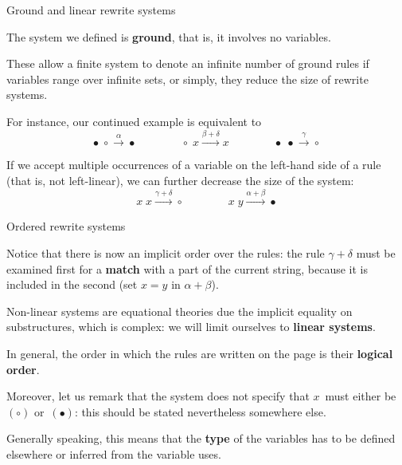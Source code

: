 \documentclass[compress,dvipdfmx]{beamer}
\begin{document}
%
\begin{frame}{Ground and linear rewrite systems}

  The system we defined is \textbf{ground}, that is, it involves no
  variables.

  \bigskip

  These allow a finite system to denote an infinite number of ground
  rules if variables range over infinite sets, or simply, they reduce
  the size of rewrite systems.

  \bigskip

  For instance, our continued example is equivalent to
  \begin{equation*}
    \bullet \; \circ \xrightarrow{\alpha} \bullet
    \qquad\qquad
    \circ \; x \xrightarrow{\beta+\delta} x
    \qquad\qquad
    \bullet \; \bullet \xrightarrow{\gamma} \circ
  \end{equation*}

  \medskip

  If we accept multiple occurrences of a variable on the
  left\hyp{}hand side of a rule (that is, not left\hyp{}linear), we
  can further decrease the size of the system:
  \begin{equation*}
    x  \; x \xrightarrow{\gamma+\delta} \circ\qquad\qquad
    x  \; y \xrightarrow{\alpha+\beta} \bullet
  \end{equation*}

\end{frame}

%
\begin{frame}{Ordered rewrite systems}

  Notice that there is now an implicit order over the rules: the rule
  \(\gamma+\delta\) must be examined first for a \textbf{match} with a
  part of the current string, because it is included in the second
  (set \(x=y\) in \(\alpha+\beta\)).

  \bigskip

  Non\hyp{}linear systems are equational theories due the implicit
  equality on substructures, which is complex: we will limit ourselves
  to \textbf{linear systems}.

  \bigskip

  In general, the order in which the rules are written on the page is
  their \textbf{logical order}.

  \bigskip

  Moreover, let us remark that the system does not specify that
  \(x\)~must either be~\((\circ)\) or~\((\bullet)\): this should be
  stated nevertheless somewhere else.

  \bigskip

  Generally speaking, this means that the \textbf{type} of the
  variables has to be defined elsewhere or inferred from the variable
  uses.

\end{frame}
\end{document}
